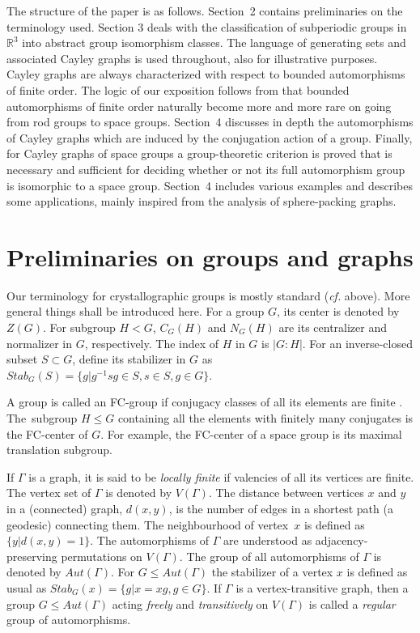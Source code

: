 \documentclass[11pt,a4paper]{article}
\newcommand{\R}{\mathbb R}
\begin{document}
The structure of the paper is as follows. Section~2 contains preliminaries on the terminology used. Section 3 deals with the classification of subperiodic groups in $\R^3$ into abstract group isomorphism classes. The language of generating sets and associated Cayley graphs is used throughout, also for illustrative purposes. Cayley graphs are always characterized with respect to bounded automorphisms of finite order. The logic of our exposition follows from that bounded automorphisms of finite order naturally become more and more rare on going from rod groups to space groups. Section~4 discusses in depth the automorphisms of Cayley graphs which are induced by the conjugation action of a group. Finally, for Cayley graphs of space groups a group-theoretic criterion is proved that is necessary and sufficient for deciding whether or not its full automorphism group is isomorphic to a space group. Section~4 includes various examples and describes some applications, mainly inspired from the analysis of sphere-packing graphs. %


\section{Preliminaries on groups and graphs}

Our terminology for crystallographic groups is mostly standard (\emph{cf.} above). More general things shall be introduced here. For a group $G$, its center is denoted by $Z(G)$. For subgroup $H<G$, $C_G(H)$ and $N_G(H)$ are its centralizer and normalizer in $G$, respectively. The index of $H$ in $G$ is $|G:H|$. For an inverse-closed subset $S \subset G$, define its stabilizer in $G$ as $Stab_G(S) = \{ g|g^{-1}sg \in S, s \in S, g \in G \}$.

A group is called an FC-group if conjugacy classes of all its elements are finite \cite{Tom84}. The~subgroup $H \leq G$ containing all the elements with finitely many conjugates is the FC-center of $G$. For example, the FC-center of a space group is its maximal translation subgroup.

If $\Gamma$ is a graph, it is said to be \emph{locally finite} if valencies of all its vertices are finite. The vertex set of $\Gamma$ is denoted by $V(\Gamma)$. The distance between vertices $x$ and $y$ in a (connected) graph, $d(x, y)$, is the number of edges in a shortest path (a geodesic) connecting them. The neighbourhood of vertex~$x$ is defined as $\{y|d(x, y) = 1\}$. The automorphisms of $\Gamma$ are understood as adjacency-preserving permutations on $V(\Gamma)$. The group of all automorphisms of $\Gamma$ is denoted by $Aut(\Gamma)$. For $G \leq Aut(\Gamma)$ the stabilizer of a vertex $x$ is defined as usual as $Stab_G(x) = \{g|x=xg, g \in G\}$. If $\Gamma$ is a vertex-transitive graph, then a group $G \leq Aut(\Gamma)$ acting \emph{freely} and \emph{transitively} on $V(\Gamma)$ is called a \emph{regular} group of automorphisms. 
\end{document}
